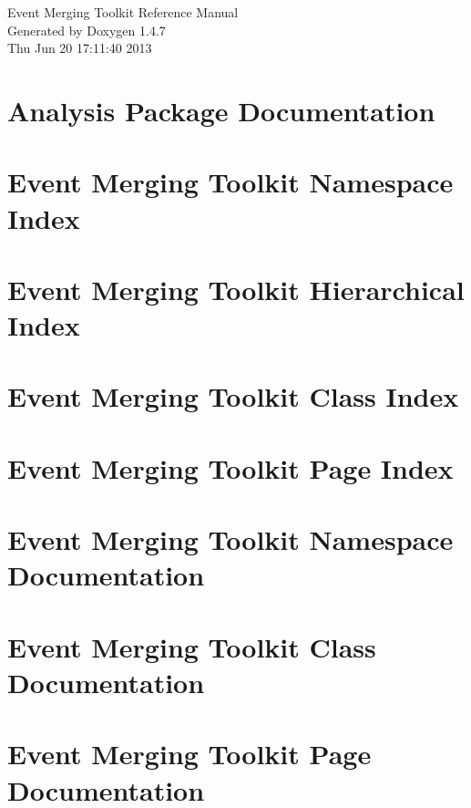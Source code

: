 \documentclass[a4paper]{book}
\begin{document}
\begin{titlepage}
\vspace*{7cm}
\begin{center}
{\Large Event Merging Toolkit Reference Manual}\\
\vspace*{1cm}
{\large Generated by Doxygen 1.4.7}\\
\vspace*{0.5cm}
{\small Thu Jun 20 17:11:40 2013}\\
\end{center}
\end{titlepage}
\clearemptydoublepage
{}
\tableofcontents
\clearemptydoublepage
{}
\chapter{Analysis Package Documentation }
\label{index}\hypertarget{index}{}
\chapter{Event Merging Toolkit Namespace Index}

\chapter{Event Merging Toolkit Hierarchical Index}

\chapter{Event Merging Toolkit Class Index}

\chapter{Event Merging Toolkit Page Index}

\chapter{Event Merging Toolkit Namespace Documentation}







\chapter{Event Merging Toolkit Class Documentation}



















\chapter{Event Merging Toolkit Page Documentation}

\printindex
\end{document}
